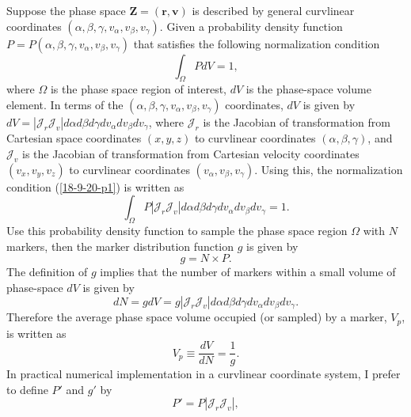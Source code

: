 \documentclass{article}
\begin{document}
Suppose the phase space $\mathbf{Z}= (\mathbf{r}, \mathbf{v})$ is described by
general curvlinear coordinates $(\alpha, \beta, \gamma, v_{\alpha}, v_{\beta},
v_{\gamma})$. Given a probability density function $P = P (\alpha, \beta,
\gamma, v_{\alpha}, v_{\beta}, v_{\gamma})$ that satisfies the following
normalization condition
\begin{equation}
  \label{18-9-20-p1} \int_{\Omega} P d V = 1,
\end{equation}
where $\Omega$ is the phase space region of interest, $d V$ is the phase-space
volume element. In terms of the $(\alpha, \beta, \gamma, v_{\alpha},
v_{\beta}, v_{\gamma})$ coordinates, $d V$ is given by $d V = | \mathcal{J}_r
\mathcal{J}_v | d \alpha d \beta d \gamma d v_{\alpha} d v_{\beta} d
v_{\gamma}$, where $\mathcal{J}_r$ is the Jacobian of transformation from
Cartesian space coordinates $(x, y, z)$ to curvlinear coordinates $(\alpha,
\beta, \gamma)$, and $\mathcal{J}_v$ is the Jacobian of transformation from
Cartesian velocity coordinates $(v_x, v_y, v_z)$ to curvlinear coordinates
$(v_{\alpha}, v_{\beta}, v_{\gamma})$. Using this, the normalization condition
(\ref{18-9-20-p1}) is written as
\begin{equation}
  \int_{\Omega} P | \mathcal{J}_r \mathcal{J}_v | d \alpha d \beta d \gamma d
  v_{\alpha} d v_{\beta} d v_{\gamma} = 1.
\end{equation}
Use this probability density function to sample the phase space region
$\Omega$ with $N$ markers, then the marker distribution function $g$ is given
by
\begin{equation}
  \label{18-10-27-p1} g = N \times P.
\end{equation}
The definition of $g$ implies that the number of markers within a small volume
of phase-space $d V$ is given by
\begin{equation}
  d N = g d V = g | \mathcal{J}_r \mathcal{J}_v | d \alpha d \beta d \gamma d
  v_{\alpha} d v_{\beta} d v_{\gamma} .
\end{equation}
Therefore the average phase space volume occupied (or sampled) by a marker,
$V_p$, is written as
\begin{equation}
  \label{16-3-22-p1} V_p \equiv \frac{d V}{d N} = \frac{1}{g} .
\end{equation}
In practical numerical implementation in a curvlinear coordinate system, I
prefer to define $P'$ and $g'$ by
\begin{equation}
  P' = P | \mathcal{J}_r \mathcal{J}_v |,
\end{equation}
\end{document}

